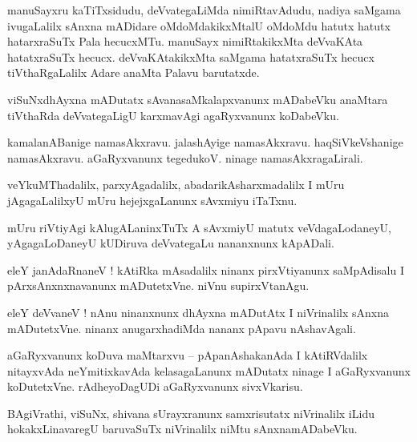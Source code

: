 \documentclass{article}
\begin{document}
\begin{mn}%
manuSayxru kaTiTxsidudu, deVvategaLiMda nimiRtavAdudu, nadiya saMgama ivugaLalilx sAnxna mADidare 
oMdoMdakikxMtalU oMdoMdu hatutx hatutx hatarxraSuTx Pala hecucxMTu. manuSayx nimiRtakikxMta 
deVvaKAta hatatxraSuTx hecucx. deVvaKAtakikxMta saMgama hatatxraSuTx hecucx tiVthaRgaLalilx Adare 
anaMta Palavu barutatxde.
\end{mn}

\begin{mn}%
viSuNxdhAyxna mADutatx sAvanasaMkalapxvanunx mADabeVku anaMtara tiVthaRda deVvategaLigU karxmavAgi 
agaRyxvanunx koDabeVku.
\end{mn}

\begin{mn}%
kamalanABanige namasAkxravu. jalashAyige namasAkxravu. haqSiVkeVshanige namasAkxravu. aGaRyxvanunx 
tegedukoV. ninage namasAkxragaLirali.
\end{mn}

\begin{mn}%
veYkuMThadalilx, parxyAgadalilx, abadarikAsharxmadalilx I mUru jAgagaLalilxyU mUru hejejxgaLanunx 
sAvxmiyu iTaTxnu.
\end{mn}

\begin{mn}%
mUru riVtiyAgi kAlugALaninxTuTx A sAvxmiyU matutx veVdagaLodaneyU, yAgagaLoDaneyU kUDiruva 
deVvategaLu nananxnunx kApADali.
\end{mn}

\begin{mn}%
eleY janAdaRnaneV ! kAtiRka mAsadalilx ninanx pirxVtiyanunx saMpAdisalu I pArxsAnxnxnavanunx 
mADutetxVne. niVnu supirxVtanAgu.
\end{mn}

\begin{mn}%
eleY deVvaneV ! nAnu ninanxnunx dhAyxna mADutAtx I niVrinalilx sAnxna mADutetxVne. ninanx 
anugarxhadiMda nananx pApavu nAshavAgali.
\end{mn}

\begin{mn}%
aGaRyxvanunx koDuva maMtarxvu -- pApanAshakanAda I kAtiRVdalilx nitayxvAda neYmitixkavAda 
kelasagaLanunx mADutatx ninage I aGaRyxvanunx koDutetxVne. rAdheyoDagUDi aGaRyxvanunx sivxVkarisu.
\end{mn}

\begin{mn}%
BAgiVrathi, viSuNx, shivana sUrayxranunx samxrisutatx niVrinalilx iLidu hokakxLinavaregU baruvaSuTx 
niVrinalilx niMtu sAnxnamADabeVku.
\end{mn}
\end{document}
